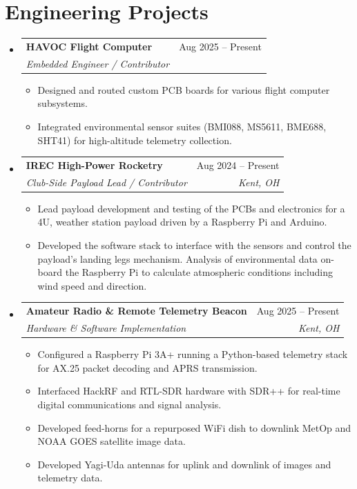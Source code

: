 \documentclass[11pt, letterpaper]{article}
\makeatletter
\newcommand{\resumeItem}[1]{\item\small{#1}}
\newcommand{\resumeSubheading}[4]{
  \vspace{-1pt}\item
    \begin{tabular*}{0.97\textwidth}[t]{l@{\extracolsep{\fill}}r}
      \textbf{#1} & #2 \\
      \textit{\small#3} & \textit{\small #4} \\
    \end{tabular*}\vspace{-5pt}
}
\makeatother
\begin{document}
\section{Engineering Projects}
\begin{itemize}[leftmargin=0.15in, label={}]
    \resumeSubheading
        {HAVOC Flight Computer}{Aug 2025 -- Present}
        {Embedded Engineer / Contributor}{}
        \begin{itemize}[leftmargin=0.15in, label={$\bullet$}]
            \resumeItem{Designed and routed custom PCB boards for various flight computer subsystems.}
            \resumeItem{Integrated environmental sensor suites (BMI088, MS5611, BME688, SHT41) for high-altitude telemetry collection.}
        \end{itemize}

    \resumeSubheading
        {IREC High-Power Rocketry}{Aug 2024 -- Present}{Club-Side Payload Lead / Contributor}{Kent, OH}
        \begin{itemize}[leftmargin=0.15in, label={$\bullet$}]
            \resumeItem{Lead payload development and testing of the PCBs and electronics for a 4U, weather station payload driven by a Raspberry Pi and Arduino.}
            \resumeItem{Developed the software stack to interface with the sensors and control the payload's landing legs mechanism. Analysis of environmental data on-board the Raspberry Pi to calculate atmospheric conditions including wind speed and direction.}
        \end{itemize}

    \resumeSubheading
        {Amateur Radio \& Remote Telemetry Beacon}{Aug 2025 -- Present}
        {Hardware \& Software Implementation}{Kent, OH}
        \begin{itemize}[leftmargin=0.15in, label={$\bullet$}]
            \resumeItem{Configured a Raspberry Pi 3A+ running a Python-based telemetry stack for AX.25 packet decoding and APRS transmission.}
            \resumeItem{Interfaced HackRF and RTL-SDR hardware with SDR++ for real-time digital communications and signal analysis.}
            \resumeItem{Developed feed-horns for a repurposed WiFi dish to downlink MetOp and NOAA GOES satellite image data.}
            \resumeItem{Developed Yagi-Uda antennas for uplink and downlink of images and telemetry data.}
        \end{itemize}


\end{itemize}
\end{document}
